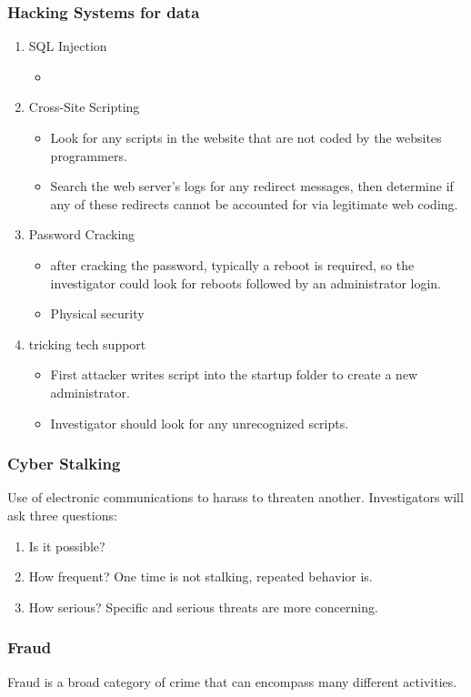 \subsubsection{Hacking Systems for data}
\begin{enumerate}
    \item SQL Injection
    \begin{itemize}
        \item 
    \end{itemize}
    \item Cross-Site Scripting
    \begin{itemize}
        \item Look for any scripts in the website that are not coded by the websites programmers.
        \item Search the web server's logs for any redirect messages, then determine if any of these redirects cannot be accounted for via legitimate web coding.
    \end{itemize}
    \item Password Cracking
    \begin{itemize}
        \item after cracking the password, typically a reboot is required, so the investigator could look for reboots followed by an administrator login.
        \item Physical security
    \end{itemize}
    \item tricking tech support
    \begin{itemize}
        \item First attacker writes script into the startup folder to create a new administrator.
        \item Investigator should look for any unrecognized scripts.
    \end{itemize}
\end{enumerate}

\subsubsection{Cyber Stalking}
Use of electronic communications to harass to threaten another.
Investigators will ask three questions:
\begin{enumerate}
    \item Is it possible?
    \item How frequent? One time is not stalking, repeated behavior is.
    \item How serious? Specific and serious threats are more concerning.
\end{enumerate}

\subsubsection{Fraud}
Fraud is a broad category of crime that can encompass many different activities.